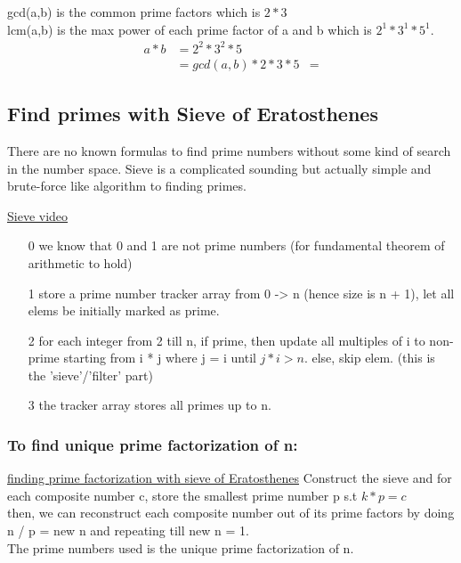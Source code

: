 \documentclass[12pt]{article}
\begin{document}
gcd(a,b) is the common prime factors which is \(2 * 3\) \\
lcm(a,b) is the max power of each prime factor of a and b which is \(2^1 * 3^1 * 5^1\). \\ 

\begin{align} 
a * b &= 2^2 * 3^2 * 5 \\
&= gcd(a, b) * 2 * 3 * 5
&= 
\end{align} 

\subsection{Find primes with Sieve of Eratosthenes} 
There are no known formulas to find prime numbers without some kind of search in the number space. 
Sieve is a complicated sounding but actually simple and brute-force like algorithm to finding primes. 

\href{https://www.khanacademy.org/computing/computer-science/cryptography/comp-number-theory/v/sieve-of-eratosthenes-prime-adventure-part-4}{Sieve video}
\begin{itemize} 
	\item[0] we know that 0 and 1 are not prime numbers (for fundamental theorem of arithmetic to hold) 
	\item[1] store a prime number tracker array from 0 -> n (hence size is n + 1), let all elems be initially marked as prime.  
	\item[2] for each integer from 2 till n, if prime, then update all multiples of i to non-prime starting from i * j where j = i until {\emph{\(j * i > n\)}}. else, skip elem. (this is the 'sieve'/'filter' part) 
	\item[3] the tracker array stores all primes up to n. 
\end{itemize} 

\subsubsection{To find unique prime factorization of n:}
\href{https://www.geeksforgeeks.org/prime-factorization-using-sieve-olog-n-multiple-queries/}{finding prime factorization with sieve of Eratosthenes} 
Construct the sieve and for each composite number c, store the smallest prime number p s.t \(k * p = c\) \\ 
then, we can reconstruct each composite number out of its prime factors by doing n / p = new n and repeating till new n = 1. \\ 
The prime numbers used is the unique prime factorization of n. 
\end{document}
